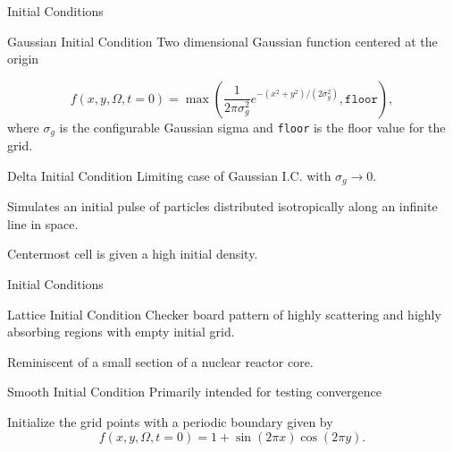 \documentclass{beamer}
\begin{document}
    \begin{frame}{Initial Conditions}
        \begin{block}{Gaussian Initial Condition}
            Two dimensional Gaussian function centered at the origin

            \begin{equation*}
                f(x, y, \Omega, t=0) = \max \left( \frac{1}{2 \pi \sigma_g^2} e^{-(x^2 + y^2) / (2 \sigma_g^2)}, \texttt{floor} \right), 
            \end{equation*}
            where $\sigma_g$ is the configurable Gaussian sigma and \texttt{floor} is the floor value for the grid.
        \end{block}

        \vfill

        \begin{block}{Delta Initial Condition}
            Limiting case of Gaussian I.C. with $\sigma_g \to 0$.

            Simulates an initial pulse of particles distributed isotropically along an infinite line in space.

            Centermost cell is given a high initial density.
        \end{block}
    \end{frame}

    \begin{frame}{Initial Conditions}
        \begin{block}{Lattice Initial Condition}
            Checker board pattern of highly scattering and highly absorbing regions with empty initial grid.

            Reminiscent of a small section of a nuclear reactor core.
        \end{block}

        \vfill

        \begin{block}{Smooth Initial Condition}
            Primarily intended for testing convergence

            Initialize the grid points with a periodic boundary given by
            \begin{equation*}
                f(x,y,\Omega,t=0) = 1 + \sin(2\pi x)\cos(2\pi y).
            \end{equation*}
        \end{block}
    \end{frame}
\end{document}
